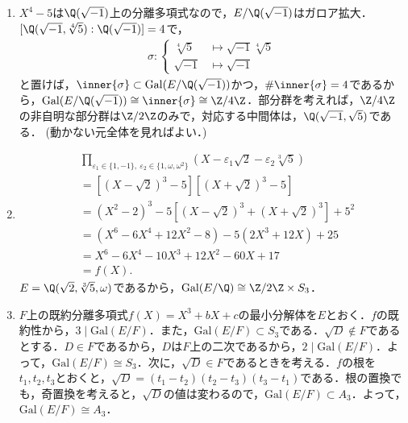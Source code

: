 \documentclass[a4paper,10pt]{ltjsarticle}
\newcommand{\gal}{\mathrm{Gal}}
\begin{document}
\begin{enumerate}
\begin{enumerate}
    \item \label{enshu:2.2.8} $\gal(E/\Q) \cong (\Z/18\Z)^{\times} \cong (\Z/2\Z)^{\times}\times(\Z/9\Z)^{\times} \cong \Z/6\Z$．$\Phi_{2\cdot3^m}(X) = X^{2\cdot3^{m-1}} - X^{3^{m-1}} + 1$．
    \item \label{enshu:2.2.9} $\gal(E/\Q) \cong \Z/2\Z \times \Z/2\Z$．$\Phi_{3\cdot2^m}(X) = X^{2^m} - X^{2^{m-1}} + 1$．
    \item \label{enshu:2.2.10} $\gal(E/\Q) \cong (\Z/16\Z)^{\times} \cong \Z/2\Z \times \Z/4\Z$．$\Phi_{2^m}(X) = X^{2^{m-1}}+1$．
  \end{enumerate}
  \item \label{enshu:2.3} $X^4 - 5$は$\Q(\sqrt{-1})$上の分離多項式なので，$E/\Q(\sqrt{-1})$はガロア拡大．$[\Q(\sqrt{-1}, \sqrt[4]{5}) : \Q(\sqrt{-1})] = 4$で，
  \begin{align*}
    \sigma : \begin{cases}
      \sqrt[4]{5} &\mapsto \sqrt{-1}\sqrt[4]{5} \\
      \sqrt{-1} &\mapsto \sqrt{-1}
    \end{cases}
  \end{align*}
  と置けば，$\inner{\sigma} \subset \gal(E/\Q(\sqrt{-1}))$かつ，$\#\inner{\sigma} = 4$であるから，$\gal(E/\Q(\sqrt{-1})) \cong \inner{\sigma} \cong \Z/4\Z$．部分群を考えれば，$\Z/4\Z$の非自明な部分群は$\Z/2\Z$のみで，対応する中間体は，$\Q(\sqrt{-1}, \sqrt{5})$である． (動かない元全体を見ればよい．)
  \item \label{enshu:2.4}
  \begin{align*}
    &\prod_{\varepsilon_1\in \{1, -1\},\ \varepsilon_2\in \{1, \omega, \omega^2\}}(X - \varepsilon_1\sqrt{2} - \varepsilon_2\sqrt[3]{5}) \\
    &= [(X - \sqrt{2})^3 - 5][(X + \sqrt{2})^3 - 5] \\
    &= (X^2 - 2)^3 - 5[(X - \sqrt{2})^3 + (X + \sqrt{2})^3] + 5^2 \\
    &= (X^6 - 6X^4 + 12X^2 - 8) - 5(2X^3 + 12X) + 25 \\
    &= X^6 - 6X^4 - 10X^3 + 12X^2 - 60X + 17 \\
    &= f(X).
  \end{align*}
  $E = \Q(\sqrt{2}, \sqrt[3]{5}, \omega)$であるから，$\gal(E/\Q) \cong \Z/2\Z \times S_3$．
  \item \label{enshu:2.5} $F$上の既約分離多項式$f(X) = X^3 + bX + c$の最小分解体を$E$とおく．$f$の既約性から，$3\mid \gal(E/F)$．また，$\gal(E/F) \subset S_3$である．$\sqrt{D}\notin F$であるとする．$D \in F$であるから，$D$は$F$上の二次であるから，$2\mid\gal(E/F)$．よって，$\gal(E/F) \cong S_3$．次に，$\sqrt{D} \in F$であるときを考える．$f$の根を$t_1, t_2, t_3$とおくと，$\sqrt{D} = (t_1 - t_2)(t_2 - t_3)(t_3 - t_1)$である．根の置換でも，奇置換を考えると，$\sqrt{D}$の値は変わるので，$\gal(E/F) \subset A_3$．よって，$\gal(E/F) \cong A_3$．

\end{enumerate}
\end{document}

